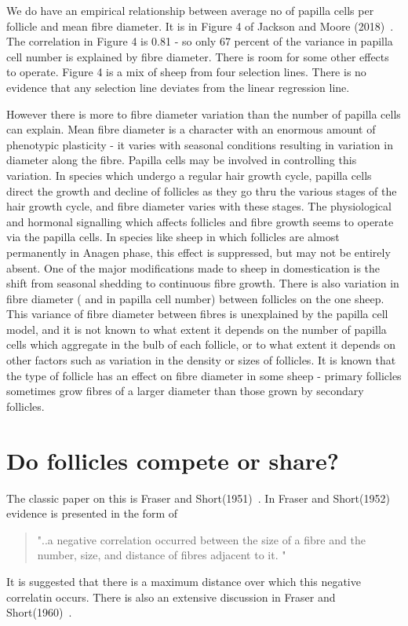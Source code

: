 \documentclass[titlepage]{article}  %
\begin{document}
We do have an empirical relationship between average no of papilla cells per follicle and mean fibre diameter. It is in Figure 4 of Jackson and Moore (2018)~\cite{jack:18}. The correlation in Figure 4 is 0.81 - so only 67 percent of the variance in papilla cell number is explained by fibre diameter. There is room for some other effects to operate. Figure 4 is a mix of sheep from four selection lines. There is no evidence that any selection line deviates from the linear regression line.

However there is more to fibre diameter variation than the number of papilla cells can explain. Mean fibre diameter is a character with an enormous amount of phenotypic plasticity - it varies with seasonal conditions resulting in variation in diameter along the fibre. Papilla cells may be involved in controlling this variation. In species which undergo a regular hair growth cycle, papilla cells direct the growth and decline of follicles as they go thru the various stages of the hair growth cycle, and fibre diameter varies with these stages. The physiological and hormonal signalling which affects follicles  and fibre growth seems to operate via the papilla cells. In species like sheep in which follicles are almost permanently in Anagen phase, this effect is suppressed, but may not be entirely absent. One of the major modifications made to sheep in domestication is the shift from seasonal shedding to continuous fibre growth. There is also variation in fibre diameter ( and in papilla cell number) between follicles on the one sheep. This variance of fibre diameter between fibres is unexplained by the papilla cell model, and it is not known to what extent it depends on the number of papilla cells which aggregate in the bulb of each follicle, or to what extent it depends on other factors such as variation in the density or sizes of follicles. It is known that the type of follicle has an effect on fibre diameter in some sheep - primary follicles sometimes grow fibres of a larger diameter than those grown by secondary follicles.

\section{Do follicles compete or share?}
The classic paper on this is Fraser and Short(1951)~\cite{fras:51}.  In Fraser and Short(1952)~\cite{fras:52} evidence is presented in the form of
\begin{quote}
"..a negative correlation occurred between the size of a fibre and the number, size, and distance of fibres adjacent to it.  "
\end{quote}
It is suggested that there is a maximum distance over which this negative correlatin occurs.
There is also an extensive discussion in Fraser and Short(1960)~\cite{fras:60}.
\end{document}
